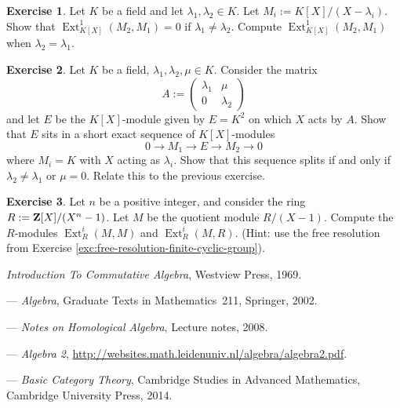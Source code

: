 \documentclass[11pt]{amsbook}
\newcommand{\longto}{\longrightarrow}
\DeclareMathOperator\Ext{Ext}
\theoremstyle{plain}
\theoremstyle{definition}
\newtheorem{exercise}{Exercise}
\begin{document}
\begin{exercise}
Let $K$ be a field and let $\lambda_1,\lambda_2\in K$. Let $M_i:= K[X]/(X-\lambda_i)$. 
Show that $\Ext^1_{K[X]}(M_2,M_1) =0$ if $\lambda_1\neq \lambda_2$. Compute 
$\Ext^1_{K[X]}(M_2,M_1)$ when $\lambda_2=\lambda_1$.
\end{exercise}

\begin{exercise}
Let $K$ be a field, $\lambda_1,\lambda_2,\mu \in K$. Consider the matrix
\[
	A := \begin{pmatrix} \lambda_1 & \mu \\ 0 & \lambda_2 \end{pmatrix}
\]
and let $E$ be the $K[X]$-module given by $E=K^2$ on which $X$ acts by $A$. Show that
$E$ sits in a short exact sequence of $K[X]$-modules
\[
	0 \longto M_1 \longto E \longto M_2 \longto 0
\]
where $M_i=K$ with $X$ acting as $\lambda_i$. Show that this sequence splits if and only if
 $\lambda_2\neq \lambda_1$ or $\mu=0$. Relate this to the previous exercise.
\end{exercise}


\begin{exercise}
Let $n$ be a positive integer, and consider the ring $R := {\mathbf{Z}}[X]/(X^n-1)$. Let $M$ be the quotient module $R/(X-1)$. Compute the $R$-modules $\Ext^i_R(M,M)$ and $\Ext^i_R(M,R)$. (Hint: use the free resolution from Exercise \ref{exc:free-resolution-finite-cyclic-group}).
\end{exercise}



\begin{thebibliography}{100}

	{\it Introduction To Commutative Algebra},
	Westview Press, 1969.

 ---
	{\it Algebra},
	Graduate Texts in Mathematics~211, Springer, 2002.
	
 ---
	{\it Notes on Homological Algebra},
	Lecture notes, 2008.

 ---
	{\it Algebra 2}, {\url{http://websites.math.leidenuniv.nl/algebra/algebra2.pdf}}.

 ---
	{\it Basic Category Theory},
	Cambridge Studies in Advanced Mathematics,  Cambridge University Press, 2014.
	
\end{thebibliography}

\printindex
\end{document}
